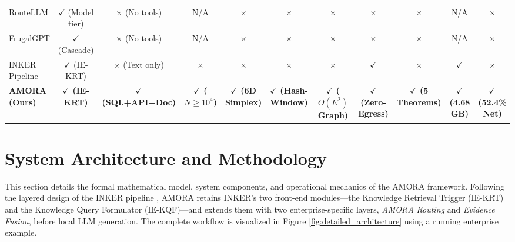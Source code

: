 \documentclass[journal,10pt,twocolumn]{IEEEtran}
\begin{document}
\begin{table}[t]
{\begin{tabular}{lcccccccccc}
RouteLLM \cite{ong2024routellm} & $\checkmark$ (Model tier) & $\times$ (No tools) & N/A & $\times$ & $\times$ & $\times$ & $\times$ & $\times$ & N/A & $\times$ \\
FrugalGPT \cite{chen2023frugalgpt} & $\checkmark$ (Cascade) & $\times$ (No tools) & N/A & $\times$ & $\times$ & $\times$ & $\times$ & $\times$ & N/A & $\times$ \\
INKER Pipeline \cite{inker2024} & $\checkmark$ (IE-KRT) & $\times$ (Text only) & $\times$ & $\times$ & $\times$ & $\times$ & $\checkmark$ & $\times$ & $\checkmark$ & $\times$ \\
\midrule
\textbf{AMORA (Ours)} & \textbf{$\checkmark$ (IE-KRT)} & \textbf{$\checkmark$ (SQL+API+Doc)} & \textbf{$\checkmark$ ($N \ge 10^4$)} & \textbf{$\checkmark$ (6D Simplex)} & \textbf{$\checkmark$ (Hash-Window)} & \textbf{$\checkmark$ ($O(E^2)$ Graph)} & \textbf{$\checkmark$ (Zero-Egress)} & \textbf{$\checkmark$ (5 Theorems)} & \textbf{$\checkmark$ (4.68 GB)} & \textbf{$\checkmark$ (52.4\% Net)} \\
\bottomrule
\end{tabular}
}
\end{table}

\section{System Architecture and Methodology}
\label{sec:architecture}

This section details the formal mathematical model, system components, and operational mechanics of the AMORA framework. Following the layered design of the INKER pipeline \cite{inker2024}, AMORA retains INKER's two front-end modules---the Knowledge Retrieval Trigger (IE-KRT) and the Knowledge Query Formulator (IE-KQF)---and extends them with two enterprise-specific layers, \textit{AMORA Routing} and \textit{Evidence Fusion}, before local LLM generation. The complete workflow is visualized in Figure \ref{fig:detailed_architecture} using a running enterprise example.
\end{document}
